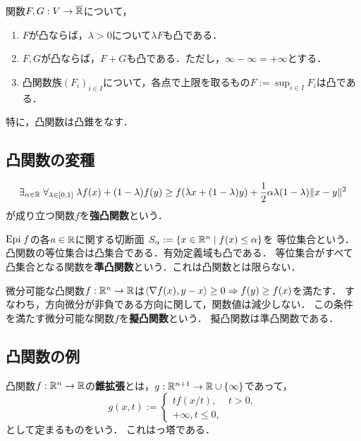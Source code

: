 \documentclass[uplatex,dvipdfmx]{jsreport}
\begin{document}
\begin{proposition}[凸関数の凸錐]
    関数$F,G:V\to\overline{\mathbb{R}}$について，
    \begin{enumerate}
        \item $F$が凸ならば，$\lambda>0$について$\lambda F$も凸である．
        \item $F,G$が凸ならば，$F+G$も凸である．ただし，$\infty-\infty=+\infty$とする．
        \item 凸関数族$(F_i)_{i\in I}$について，各点で上限を取るもの$F:=\sup_{i\in I}F_i$は凸である．
    \end{enumerate}
    特に，凸関数は凸錐をなす．
\end{proposition}

\subsection{凸関数の変種}

\begin{definition}
    \[\exists_{\alpha\in\mathbb{R}}\;\forall_{\lambda\in[0,1]}\;\lambda f(x)+(1-\lambda)f(y)\ge f(\lambda x+(1-\lambda)y)+\frac{1}{2}\alpha\lambda(1-\lambda)\|x-y\|^2\]が成り立つ関数$f$を\textbf{強凸関数}という．
\end{definition}

\begin{definition}\label{def-level-set}
    $\mathrm{Epi}\; f$の各$a\in\mathbb{R}$に関する切断面
    $S_\alpha:=\left\{x\in\mathbb{R}^n\mid f(x)\le\alpha\right\}$を
    等位集合という．凸関数の等位集合は凸集合である．有効定義域も凸である．
    等位集合がすべて凸集合となる関数を\textbf{準凸関数}という．これは凸関数とは限らない．
\end{definition}

\begin{definition}
    微分可能な凸関数$f:\mathbb{R}^n\to\mathbb{R}$は$\langle\nabla f(x),y-x\rangle\ge0\Rightarrow f(y)\ge f(x)$を満たす．
    すなわち，方向微分が非負である方向に関して，関数値は減少しない．
    この条件を満たす微分可能な関数$f$を\textbf{擬凸関数}という．
    擬凸関数は準凸関数である．
\end{definition}

\subsection{凸関数の例}

\begin{example}[perspective]
    凸関数$f:\mathbb{R}^n\to\mathbb{R}$の\textbf{錐拡張}とは，$g:\mathbb{R}^{n+1}\to\mathbb{R}\cup\{\infty\}$であって，
    \[g(x,t):=\begin{cases}
        tf(x/t),&t>0,\\
        +\infty,t\le0,
    \end{cases}\]
    として定まるものをいう．
    これはっ塔である．
\end{example}
\end{document}
